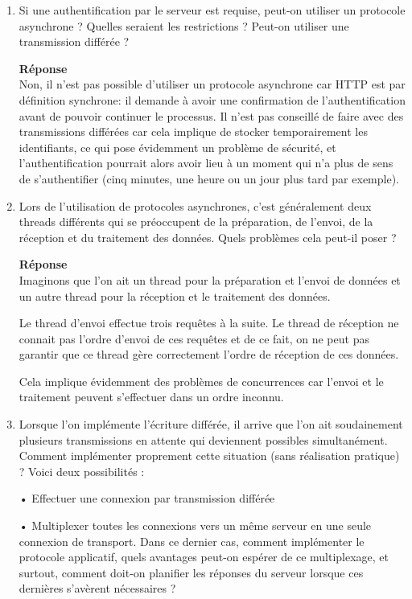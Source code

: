 \documentclass[a4paper]{article}
\begin{document}
\begin{enumerate}
    \item Si une authentification par le serveur est requise, peut-on utiliser un protocole asynchrone ? Quelles seraient les restrictions ? Peut-on utiliser une transmission différée ?
    
    \textbf{Réponse} \\
    Non, il n'est pas possible d'utiliser un protocole asynchrone car HTTP est par définition synchrone: il demande à avoir une confirmation de l'authentification avant de pouvoir continuer le processus. Il n'est pas conseillé de faire avec des transmissions différées car cela implique de stocker temporairement les identifiants, ce qui pose évidemment un problème de sécurité, et l'authentification pourrait alors avoir lieu à un moment qui n'a plus de sens de s'authentifier (cinq minutes, une heure ou un jour plus tard par exemple).
    
    \item Lors de l'utilisation de protocoles asynchrones, c'est généralement deux threads différents qui se préoccupent de la préparation, de l'envoi, de la réception et du traitement des données. Quels problèmes cela peut-il poser ?
    
    \textbf{Réponse} \\
    Imaginons que l'on ait un thread pour la préparation et l'envoi de données et un autre thread pour la réception et le traitement des données.
    
    Le thread d'envoi effectue trois requêtes à la suite. Le thread de réception ne connait pas l'ordre d'envoi de ces requêtes et de ce fait, on ne peut pas garantir que ce thread gère correctement l'ordre de réception de ces données.
    
    Cela implique évidemment des problèmes de concurrences car l'envoi et le traitement peuvent s'effectuer dans un ordre inconnu.
    
    \newpage
    
    \item Lorsque l'on implémente l'écriture différée, il arrive que l'on ait soudainement plusieurs transmissions en attente qui deviennent possibles simultanément. Comment implémenter proprement cette situation (sans réalisation pratique) ? Voici deux possibilités :
    
    • Effectuer une connexion par transmission différée
    
    • Multiplexer toutes les connexions vers un même serveur en une seule connexion de transport.
    Dans ce dernier cas, comment implémenter le protocole applicatif, quels avantages peut-on
    espérer de ce multiplexage, et surtout, comment doit-on planifier les réponses du serveur
    lorsque ces dernières s'avèrent nécessaires ?
    

\end{enumerate}
\end{document}
